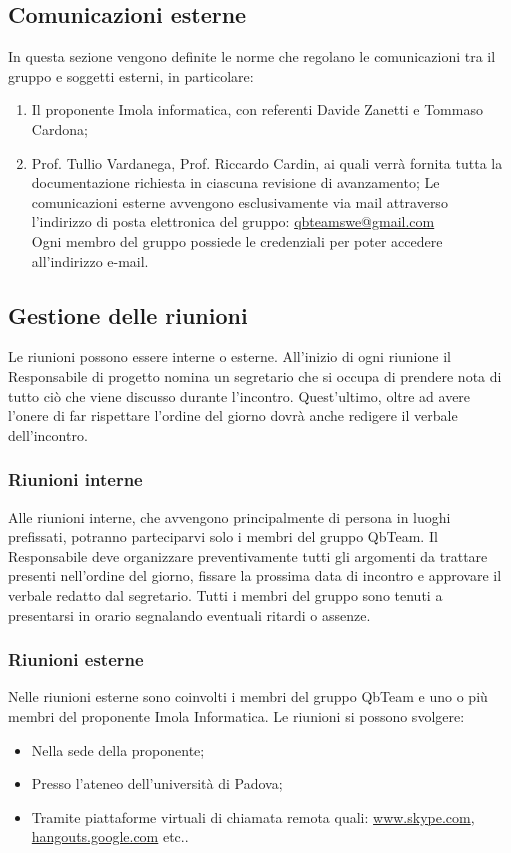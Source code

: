 \subsection{Comunicazioni esterne}

In questa sezione vengono definite le norme che regolano le comunicazioni tra il gruppo e soggetti esterni, in particolare:
\begin{enumerate}
	\item Il proponente Imola informatica, con referenti Davide Zanetti e Tommaso Cardona;
	\item Prof. Tullio Vardanega, Prof. Riccardo Cardin, ai quali verrà fornita tutta la documentazione richiesta in ciascuna revisione di avanzamento;
	Le comunicazioni esterne avvengono esclusivamente via mail attraverso l’indirizzo di posta elettronica del gruppo:
	\url{qbteamswe@gmail.com} \\
	Ogni membro del gruppo possiede le credenziali per poter accedere all’indirizzo e-mail.

	\end{enumerate}
	
\subsection{Gestione delle riunioni}
Le riunioni possono essere interne o esterne. All’inizio di ogni riunione il Responsabile di progetto nomina un segretario che si occupa di prendere nota di tutto ciò che viene discusso durante l’incontro. Quest’ultimo, oltre ad avere l’onere di far rispettare l’ordine del giorno dovrà anche redigere il verbale dell’incontro.

\subsubsection{Riunioni interne}
Alle riunioni interne, che avvengono principalmente di persona in luoghi prefissati, potranno parteciparvi solo i membri del gruppo QbTeam.
Il Responsabile deve organizzare preventivamente tutti gli argomenti da trattare presenti nell’ordine del giorno, fissare la prossima data di incontro e approvare il verbale redatto dal segretario.
Tutti i membri del gruppo sono tenuti a presentarsi in orario segnalando eventuali ritardi o assenze.
\subsubsection{Riunioni esterne}
Nelle riunioni esterne sono coinvolti i membri del gruppo QbTeam e uno o più membri del proponente Imola Informatica.
Le riunioni si possono svolgere:
\begin{itemize}
	\item Nella sede della proponente;
	\item Presso l’ateneo dell’università di Padova;
	\item Tramite piattaforme virtuali di chiamata remota quali: \url{www.skype.com}, \url{hangouts.google.com} etc..

	\end{itemize}
	
